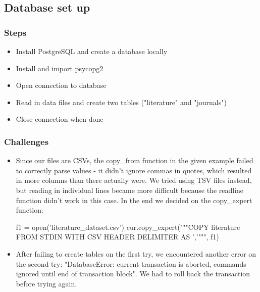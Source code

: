 \documentclass[11pt]{article}
\providecommand{\tightlist}{%
      \setlength{\itemsep}{0pt}\setlength{\parskip}{0pt}}
\newenvironment{Shaded}{}{}
\newcommand{\StringTok}[1]{\textcolor[rgb]{0.25,0.44,0.63}{{#1}}}
\newcommand{\NormalTok}[1]{{#1}}
\newcommand{\OperatorTok}[1]{\textcolor[rgb]{0.40,0.40,0.40}{{#1}}}
\newcommand{\BuiltInTok}[1]{{#1}}
\begin{document}
    \subsection{Database set up}\label{database-set-up}

\subsubsection{Steps}\label{steps}

\begin{itemize}
\tightlist
\item
  Install PostgreSQL and create a database locally
\item
  Install and import psycopg2
\item
  Open connection to database
\item
  Read in data files and create two tables ("literature" and "journals")
\item
  Close connection when done
\end{itemize}

\subsubsection{Challenges}\label{challenges}

\begin{itemize}
\item
  Since our files are CSVs, the copy\_from function in the given example
  failed to correctly parse values - it didn't ignore commas in quotes,
  which resulted in more columns than there actually were. We tried
  using TSV files instead, but reading in individual lines became more
  difficult because the readline function didn't work in this case. In
  the end we decided on the copy\_expert function:

\begin{Shaded}
\begin{Highlighting}[]
\NormalTok{f1 }\OperatorTok{=} \BuiltInTok{open}\NormalTok{(}\StringTok{'literature_dataset.csv'}\NormalTok{)}
\NormalTok{cur.copy_expert(}\StringTok{"""COPY literature FROM STDIN WITH CSV HEADER DELIMITER AS ','"""}\NormalTok{, f1)}
\end{Highlighting}
\end{Shaded}
\item
  After failing to create tables on the first try, we encountered
  another error on the second try: "DatabaseError: current transaction
  is aborted, commands ignored until end of transaction block". We had
  to roll back the transaction before trying again.
\end{itemize}
\end{document}
